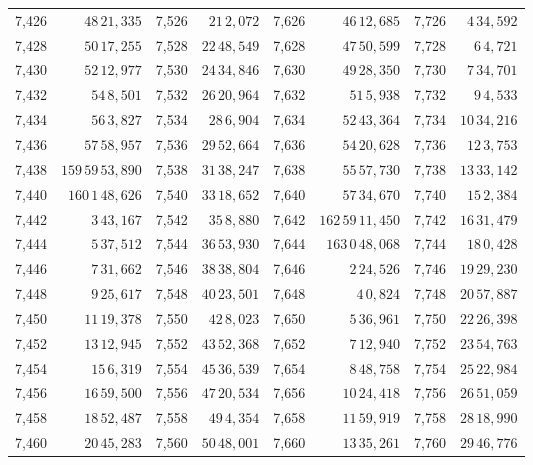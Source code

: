\begin{tabular}{|r|r||r|r||r|r||r|r|}
7,426 & \(48\,21,\!335\) & 7,526 & \(21\,2,\!072\) & 7,626 & \(46\,12,\!685\) & 7,726 & \(4\,34,\!592\) \\
7,428 & \(50\,17,\!255\) & 7,528 & \(22\,48,\!549\) & 7,628 & \(47\,50,\!599\) & 7,728 & \(6\,4,\!721\) \\
7,430 & \(52\,12,\!977\) & 7,530 & \(24\,34,\!846\) & 7,630 & \(49\,28,\!350\) & 7,730 & \(7\,34,\!701\) \\[1pt]
7,432 & \(54\,8,\!501\) & 7,532 & \(26\,20,\!964\) & 7,632 & \(51\,5,\!938\) & 7,732 & \(9\,4,\!533\) \\
7,434 & \(56\,3,\!827\) & 7,534 & \(28\,6,\!904\) & 7,634 & \(52\,43,\!364\) & 7,734 & \(10\,34,\!216\) \\
7,436 & \(57\,58,\!957\) & 7,536 & \(29\,52,\!664\) & 7,636 & \(54\,20,\!628\) & 7,736 & \(12\,3,\!753\) \\
7,438 & \(159\,59\,53,\!890\) & 7,538 & \(31\,38,\!247\) & 7,638 & \(55\,57,\!730\) & 7,738 & \(13\,33,\!142\) \\
7,440 & \(160\,1\,48,\!626\) & 7,540 & \(33\,18,\!652\) & 7,640 & \(57\,34,\!670\) & 7,740 & \(15\,2,\!384\) \\[1pt]
7,442 & \(3\,43,\!167\) & 7,542 & \(35\,8,\!880\) & 7,642 & \(162\,59\,11,\!450\) & 7,742 & \(16\,31,\!479\) \\
7,444 & \(5\,37,\!512\) & 7,544 & \(36\,53,\!930\) & 7,644 & \(163\,0\,48,\!068\) & 7,744 & \(18\,0,\!428\) \\
7,446 & \(7\,31,\!662\) & 7,546 & \(38\,38,\!804\) & 7,646 & \(2\,24,\!526\) & 7,746 & \(19\,29,\!230\) \\
7,448 & \(9\,25,\!617\) & 7,548 & \(40\,23,\!501\) & 7,648 & \(4\,0,\!824\) & 7,748 & \(20\,57,\!887\) \\
7,450 & \(11\,19,\!378\) & 7,550 & \(42\,8,\!023\) & 7,650 & \(5\,36,\!961\) & 7,750 & \(22\,26,\!398\) \\[1pt]
7,452 & \(13\,12,\!945\) & 7,552 & \(43\,52,\!368\) & 7,652 & \(7\,12,\!940\) & 7,752 & \(23\,54,\!763\) \\
7,454 & \(15\,6,\!319\) & 7,554 & \(45\,36,\!539\) & 7,654 & \(8\,48,\!758\) & 7,754 & \(25\,22,\!984\) \\
7,456 & \(16\,59,\!500\) & 7,556 & \(47\,20,\!534\) & 7,656 & \(10\,24,\!418\) & 7,756 & \(26\,51,\!059\) \\
7,458 & \(18\,52,\!487\) & 7,558 & \(49\,4,\!354\) & 7,658 & \(11\,59,\!919\) & 7,758 & \(28\,18,\!990\) \\
7,460 & \(20\,45,\!283\) & 7,560 & \(50\,48,\!001\) & 7,660 & \(13\,35,\!261\) & 7,760 & \(29\,46,\!776\) \\[1pt]

\end{tabular}
